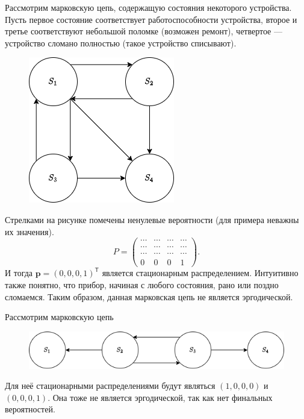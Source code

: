 \begin{ex}
  Рассмотрим марковскую цепь, содержащую состояния некоторого устройства. Пусть первое 
  состояние соответствует работоспособности устройства, второе и третье
  соответствуют небольшой поломке (возможен ремонт),
  четвертое --- устройство сломано полностью (такое устройство списывают).
  \begin{figure}[h!]
    \centering
    \includegraphics[width=0.3\linewidth]{stoproc/Figures/lec2-ex2}
  \end{figure}
  
  Стрелками на рисунке помечены ненулевые вероятности (для примера неважны их
  значения).
  \[
    P = \begin{pmatrix}
      \cdots & \cdots & \cdots & \cdots\\
      \cdots & \cdots & \cdots & \cdots\\
      \cdots & \cdots & \cdots & \cdots \\
      0 & 0 & 0 & 1
    \end{pmatrix}.
  \]
  И тогда $\mathbf p = (0, 0, 0, 1)^{\mathsf T}$ является стационарным распределением.
  Интуитивно также понятно, что прибор, начиная с любого состояния, рано или поздно сломаемся.
  Таким образом, данная марковская цепь не является эргодической.
\end{ex}

\begin{ex}
  Рассмотрим марковскую цепь
  \begin{figure}[h!]
    \centering
    \includegraphics[width=0.7\linewidth]{stoproc/Figures/lec2-ex3}
  \end{figure}
  
  Для неё стационарными распределениями будут являться $(1, 0, 0, 0)$
  и $(0, 0, 0, 1)$. Она тоже не является эргодической, так как нет финальных
  вероятностей.
\end{ex}

